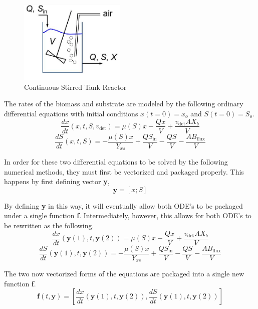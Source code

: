\documentclass[letterpaper, twoside]{article}
\numberwithin{equation}{section}
\begin{document}
\begin{figure}[H]
\centering
\includegraphics[width=2in]{CSTR_model.jpg}
\caption{Continuous Stirred Tank Reactor}
\end{figure}

The rates of the biomass and substrate are modeled by the following ordinary differential equations with initial conditions $x(t=0)=x_o$ and $S(t=0)=S_o$.
\begin{equation} \label{eq: BiomassEquation}
  \frac{dx}{dt}(x,t,S,v_\mathrm{det}) = \mu(S) x - \frac{Q x}{V} + \frac{ v_{\mathrm{det}} A X_b}{V}
\end{equation}
\begin{equation} \label{eq: SubstrateEquation}
  \frac{dS}{dt}(x,t,S) = -\frac{\mu(S) x}{Y_{xs}} + \frac{Q S_{\mathrm{in}}}{V} - \frac{Q S}{V} - \frac{A B_{\mathrm{flux}}}{V}
\end{equation}

In order for these two differential equations to be solved by the following numerical methods, they must first be vectorized and packaged properly. This happens by first defining vector \textbf{y},
\begin{equation}
  \textbf{y} = [x;  S]
\end{equation}

By defining \textbf{y} in this way, it will eventually allow both ODE's to be packaged under a single function \textbf{f}. Intermediately, however, this allows for both ODE's to be rewritten as the following.
\begin{equation} \label{eq: BiomassEquationVectorized}
  \frac{dx}{dt}(\textbf{y}(1),t,\textbf{y}(2)) = \mu(S) x - \frac{Q x}{V} + \frac{ v_{\mathrm{det}} A X_b}{V}
\end{equation}
\begin{equation} \label{eq: SubstrateEquationVectorized}
  \frac{dS}{dt}(\textbf{y}(1),t,\textbf{y}(2)) = -\frac{\mu(S) x}{Y_{xs}} + \frac{Q S_{\mathrm{in}}}{V} - \frac{Q S}{V} - \frac{A B_{\mathrm{flux}}}{V}
\end{equation}

The two now vectorized forms of the equations are packaged into a single new function \textbf{f}.
\begin{equation} \label{eq: ODEpackagef}
  \textbf{f}(t,\textbf{y}) = \left[\frac{dx}{dt}\left(\textbf{y}(1),t,\textbf{y}(2)\right) , 
	      \frac{dS}{dt}\left(\textbf{y}(1),t,\textbf{y}(2)\right)\right]
\end{equation}
\end{document}
